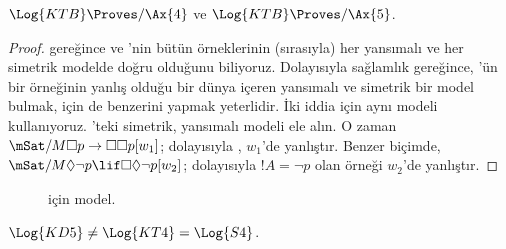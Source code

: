 \documentclass[../../../include/open-logic-section]{subfiles}
\begin{document}
\begin{thm}
  $\Log{KTB} \Proves/ \Ax{4}$ ve $\Log{KTB} \Proves/ \Ax{5}$.
\end{thm}

\begin{proof}
   gereğince  ve 'nin bütün
  örneklerinin (sırasıyla) her yansımalı ve her simetrik modelde doğru
  olduğunu biliyoruz. Dolayısıyla sağlamlık gereğince, 'ün bir
  örneğinin yanlış olduğu bir dünya içeren yansımalı ve simetrik bir model
  bulmak,  için de benzerini yapmak yeterlidir. İki iddia için aynı
  modeli kullanıyoruz. 'teki simetrik, yansımalı modeli
  ele alın. O zaman $\mSat/{M}{\Box p \to \Box \Box p}[w_1]$; dolayısıyla
  , $w_1$'de yanlıştır. Benzer biçimde,
  $\mSat/{M}{\Diamond \lnot p \lif \Box \Diamond \lnot p}[w_2]$;
  dolayısıyla $!A = \lnot p$ olan  örneği $w_2$'de yanlıştır.
\end{proof}

\begin{figure}[htpb]
  \centering
  \caption{ için model.}
\end{figure}

\begin{thm}
  $\Log{KD5} \neq \Log{KT4} = \Log{S4}$.
\end{thm}
\end{document}
